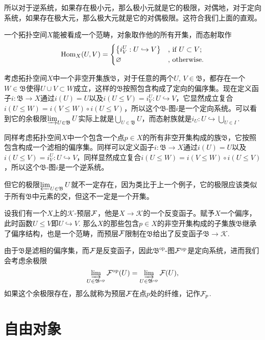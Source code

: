 所以对于逆系统，如果存在极小元，那么极小元就是它的极限，对偶地，对于定向系统，如果存在极大元，那么极大元就是它的对偶极限。这符合我们上面的直观。

\para 一个拓扑空间$X$能被看成一个范畴，对象取作他的所有开集，而态射取作
\[
	\operatorname{Hom}_{X}(U,V)=\begin{cases}
	\bigl\{i^U_V:U\hookrightarrow V\bigr\}&\text{, if }U\subset V\text{;}\\
	\varnothing&\text{, otherwise}.
	\end{cases}
\]

考虑拓扑空间$X$中一个非空开集族$\mathfrak{B}$，对于任意的两个$U$, $V\in \mathfrak{B}$，都存在一个$W\in \mathfrak{B}$使得$U\cup V\subset W$成立，这样的$\mathfrak{B}$按照包含构成了定向的偏序集。现在定义函子$i:\mathfrak{B}\to X$通过$i(U)=U$以及$i(U\leq V)=i^U_V:U\hookrightarrow V$，它显然成立复合$i(U\leq W)=i(V\leq W)\circ i(U\leq V)$，所以这个$\mathfrak{B}$-图$i$是一个定向系统。可以看到它的余极限$\varinjlim_{U\in \mathfrak{B}} U$实际上就是$\bigcup_{U\in \mathfrak{B}} U$，而态射族就是$i_U:U\hookrightarrow \bigcup_{U\in I}$.

同样考虑拓扑空间$X$中一个包含一个点$p\in X$的所有非空开集构成的族$\mathfrak{B}$，它按照包含构成一个滤相的偏序集。同样可以定义函子$i:\mathfrak{B}\to X$通过$i(U)=U$以及$i(U\leq V)=i^U_V:U\hookrightarrow V$，同样显然成立复合$i(U\leq W)=i(V\leq W)\circ i(U\leq V)$，所以这个$\mathfrak{B}$-图$i$是一个逆系统。

但它的极限$\varprojlim_{U\in \mathfrak{B}} U$就不一定存在，因为类比于上一个例子，它的极限应该类似于所有$\mathfrak{B}$中元素的交，但这不一定是一个开集。

\para 设我们有一个$X$上的$\mathcal{K}$-预层$\mathcal{F}$，他是$X\to \mathcal{K}$的一个反变函子。赋予$X$一个偏序，此时函数$U\leq V$即$U\hookrightarrow V$. 那么$X$的那些包含$p\in X$的非空开集构成的子集族$\mathfrak{B}$继承了偏序结构，也是一个范畴，而预层$\mathcal{F}$限制在$\mathfrak{B}$给出了反变函子$\mathfrak{B}\to \mathcal{K}$.

由于$\mathfrak{B}$是滤相的偏序集，而$\mathcal{F}$是反变函子，因此$\mathfrak{B}^{\mathrm{op}}$-图$\mathcal{F}^{\mathrm{op}}$是定向系统，进而我们会考虑余极限
\[
	\varinjlim_{U\in \mathfrak{B}^{\mathrm{op}}} \mathcal{F}^{\mathrm{op}}(U)=\varinjlim_{U\in \mathfrak{B}^{\mathrm{op}}} \mathcal{F}(U),
\]
如果这个余极限存在，那么就称为预层$\mathcal{F}$在点$p$处的纤维，记作$\mathcal{F}_p$.

\section{自由对象}

